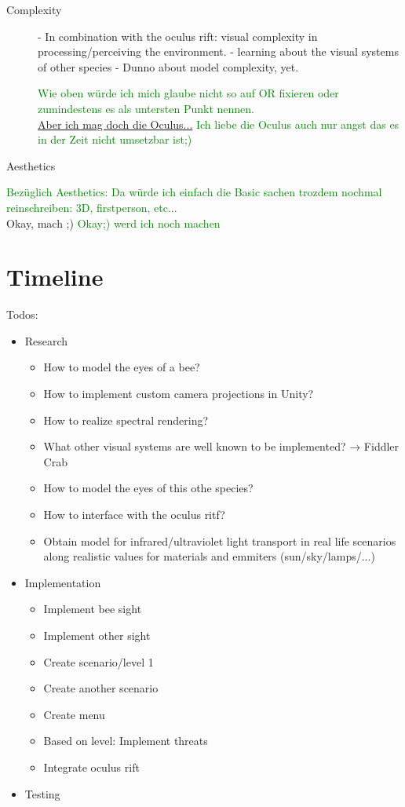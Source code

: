 \documentclass{acm_proc_article-sp}
\newcommand{\sebastian}[1]{\textcolor{Green}{#1}}
\newcommand{\stefan}[1]{\textcolor{BurntOrange}{#1}}
\begin{document}
\begin{description}
\item[Complexity]
- In combination with the oculus rift: visual complexity in
  processing/perceiving the environment.
- learning about the visual systems of other species
- Dunno about model complexity, yet.

\sebastian{Wie oben würde ich mich glaube nicht so auf OR fixieren oder
zumindestens es als untersten Punkt nennen.}\\
\stefan{\href{https://www.youtube.com/watch?v=F54ME85o_aQ}
{Aber ich mag doch die Oculus...}}
\sebastian{Ich liebe die Oculus auch nur angst das es in der Zeit nicht umsetzbar ist;)}


\item[Aesthetics]
\end{description}

\sebastian{Bezüglich Aesthetics: Da würde ich einfach die Basic sachen trozdem
nochmal reinschreiben: 3D, firstperson, etc...}\\
\stefan{Okay, mach ;)}
\sebastian{Okay;) werd ich noch machen}


\section{Timeline}

Todos:
\begin{itemize}
  \item Research
  \begin{itemize}
    \item How to model the eyes of a bee?
    \item How to implement custom camera projections in Unity?
    \item How to realize spectral rendering?
    \item What other visual systems are well known to be implemented? → Fiddler Crab
    \item How to model the eyes of this othe species?
    \item How to interface with the oculus ritf?
    \item Obtain model for infrared/ultraviolet light transport in real life
          scenarios along realistic values for materials and emmiters (sun/sky/lamps/...)
  \end{itemize}
  \item Implementation
  \begin{itemize}
    \item Implement bee sight
    \item Implement other sight
    \item Create scenario/level 1
    \item Create another scenario
    \item Create menu
    \item Based on level: Implement threats
    \item Integrate oculus rift
  \end{itemize}
  \item Testing
\end{itemize}
\end{document}
